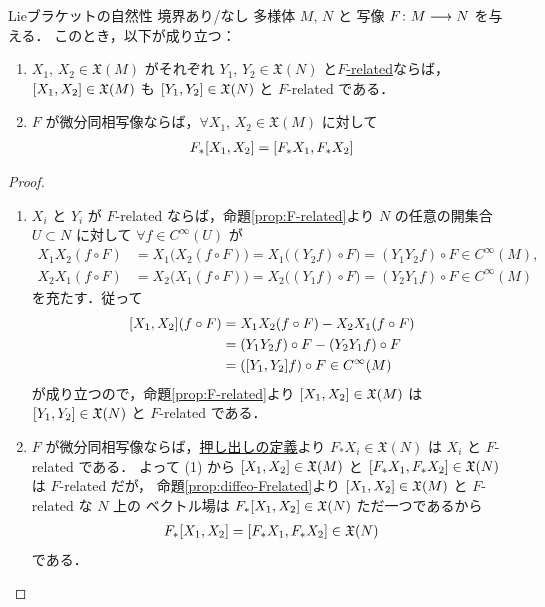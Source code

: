 \documentclass[TQFT_main]{subfiles}
\begin{document}
\begin{myprop}[label=prop:Lie-bracket-natural]{Lieブラケットの自然性}
    境界あり/なし \cinfty 多様体 $M,\, N$ と \cinfty 写像 $F \colon M \longrightarrow N$ を与える．
    このとき，以下が成り立つ：
    \begin{enumerate}
        \item $X_1,\, X_2 \in \mathfrak{X}(M)$ がそれぞれ $Y_1,\, Y_2 \in \mathfrak{X}(N)$ と\hyperref[def:F-related]{$F$-related}ならば，
        $\comm{X_1}{X_2} \in \mathfrak{X}(M)$ も $\comm{Y_1}{Y_2} \in \mathfrak{X}(N)$ と $F$-related である．
        \item $F$ が微分同相写像ならば，$\forall X_1,\, X_2 \in \mathfrak{X}(M)$ に対して
        \begin{align}
            F_* \comm{X_1}{X_2} = \comm{F_* X_1}{F_* X_2}
        \end{align}
    \end{enumerate}
    
\end{myprop}

\begin{proof}
    \begin{enumerate}
        \item $X_i$ と $Y_i$ が $F$-related ならば，命題\ref{prop:F-related}より $N$ の任意の開集合 $U \subset N$ に対して $\forall f \in C^\infty (U)$ が
        \begin{align}
            X_1 X_2 (f \circ F) &= X_1 \bigl( X_2(f \circ F) \bigr) = X_1 \bigl( (Y_2f) \circ F \bigr) = (Y_1Y_2 f) \circ F \in C^\infty (M), \\
            X_2 X_1 (f \circ F) &= X_2 \bigl( X_1(f \circ F) \bigr) = X_2 \bigl( (Y_1f) \circ F \bigr) = (Y_2Y_1 f) \circ F \in C^\infty (M)
        \end{align}
        を充たす．従って
        \begin{align}
            \comm{X_1}{X_2}(f \circ F) &= X_1X_2(f \circ F) - X_2X_1(f \circ F) \\
            &= (Y_1Y_2 f) \circ F - (Y_2Y_1f) \circ F \\
            &= (\comm{Y_1}{Y_2} f) \circ F \in C^\infty (M)
        \end{align}
        が成り立つので，命題\ref{prop:F-related}より $\comm{X_1}{X_2} \in \mathfrak{X}(M)$ は $\comm{Y_1}{Y_2} \in \mathfrak{X}(N)$ と $F$-related である．
        \item $F$ が微分同相写像ならば，\hyperref[prop:diffeo-Frelated]{押し出しの定義}より $F_* X_i \in \mathfrak{X}(N)$ は $X_i$ と $F$-related である．
        よって (1) から $\comm{X_1}{X_2} \in \mathfrak{X}(M)$ と $\comm{F_* X_1}{F_* X_2} \in \mathfrak{X}(N)$ は $F$-related だが，
        命題\ref{prop:diffeo-Frelated}より $\comm{X_1}{X_2} \in \mathfrak{X}(M)$ と $F$-related な $N$ 上の \cinfty ベクトル場は $F_* \comm{X_1}{X_2} \in \mathfrak{X}(N)$ ただ一つであるから
        \begin{align}
            F_*\comm{X_1}{X_2} = \comm{F_* X_1}{F_* X_2} \in \mathfrak{X}(N)
        \end{align}
        である．
    \end{enumerate}
    
\end{proof}
\end{document}
